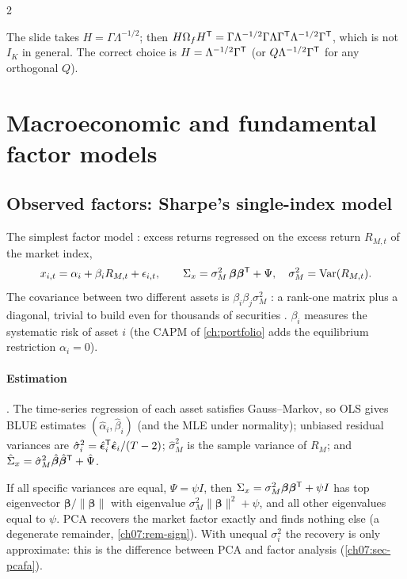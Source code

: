 \begin{paracol}{2}
\begin{coursenote}
The slide takes $H=\Gamma\Lambda^{-1/2}$; then $H\Omega_fH^{\mathsf T}=\Gamma\Lambda^{-1/2}\Gamma\Lambda\Gamma^{\mathsf T}\Lambda^{-1/2}\Gamma^{\mathsf T}$, which is not $I_K$ in general.
The correct choice is $H=\Lambda^{-1/2}\Gamma^{\mathsf T}$ (or $Q\Lambda^{-1/2}\Gamma^{\mathsf T}$ for any orthogonal $Q$).
\end{coursenote}

\section{Macroeconomic and fundamental factor models}\label{ch07:sec-macrofund}

\subsection{Observed factors: Sharpe's single-index model}
The simplest factor model : excess returns regressed on the excess return $R_{M,t}$ of the
market index,
\[
  x_{i,t}=\alpha_i+\beta_iR_{M,t}+\epsilon_{i,t},\qquad
  \Sigma_x=\sigma_M^2\,\bm\beta\bm\beta^{\mathsf T}+\Psi,\quad \sigma_M^2=\operatorname{Var}(R_{M,t}) .
\]
The covariance between two different assets is $\beta_i\beta_j\sigma_M^2$ : a rank-one matrix plus a
diagonal, trivial to build even for thousands of securities . $\beta_i$ measures the systematic
risk of asset $i$ (the CAPM of \cref{ch:portfolio} adds the equilibrium restriction $\alpha_i=0$).

\paragraph{Estimation} . The time-series regression of each asset satisfies Gauss--Markov, so OLS
gives BLUE estimates $(\hat\alpha_i,\hat\beta_i)$ (and the MLE under normality); unbiased residual variances are
$\hat\sigma_i^2=\hat{\bm\epsilon}_i^{\mathsf T}\hat{\bm\epsilon}_i/(T-2)$; $\hat\sigma_M^2$ is the sample variance of $R_M$; and
$\hat\Sigma_x=\hat\sigma_M^2\hat{\bm\beta}\hat{\bm\beta}^{\mathsf T}+\hat\Psi$.

\begin{intuition}
If all specific variances are equal, $\Psi=\psi I$, then $\Sigma_x=\sigma_M^2\bm\beta\bm\beta^{\mathsf T}+\psi I$ has top eigenvector
$\bm\beta/\|\bm\beta\|$ with eigenvalue $\sigma_M^2\|\bm\beta\|^2+\psi$, and all other eigenvalues equal to $\psi$. PCA recovers the
market factor exactly and finds nothing else (a degenerate remainder, \cref{ch07:rem-sign}). With unequal
$\sigma_i^2$ the recovery is only approximate: this is the difference between PCA and factor analysis
(\cref{ch07:sec-pcafa}).
\end{intuition}


\end{paracol}
